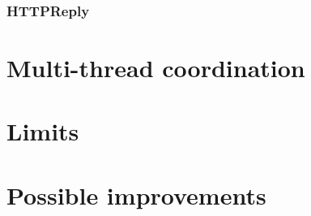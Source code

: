 \documentclass[11pt]{article}
\begin{document}
\subsubsection{HTTPReply}

\section{Multi-thread coordination}

\section{Limits}

\section{Possible improvements}
\end{document}
